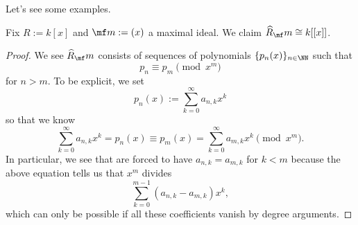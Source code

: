 Let's see some examples.
\begin{exe}
	Fix $R:=k[x]$ and $\mf m:=(x)$ a maximal ideal. We claim $\widehat R_\mf m\cong k[[x]]$.
\end{exe}
\begin{proof}
	We see $\widehat R_\mf m$ consists of sequences of polynomials $\{p_n(x)\}_{n\in\NN}$ such that
	\[p_n\equiv p_m\pmod{x^m}\]
	for $n>m$. To be explicit, we set
	\[p_n(x):=\sum_{k=0}^\infty a_{n,k}x^k\]
	so that we know
	\[\sum_{k=0}^\infty a_{n,k}x^k=p_n(x)\equiv p_m(x)=\sum_{k=0}^\infty a_{m,k}x^k\pmod{x^m}.\]
	In particular, we see that are forced to have $a_{n,k}=a_{m,k}$ for $k<m$ because the above equation tells us that $x^m$ divides
	\[\sum_{k=0}^{m-1}(a_{n,k}-a_{m,k})x^k,\]
	which can only be possible if all these coefficients vanish by degree arguments.


\end{proof}
